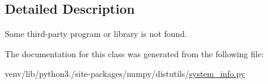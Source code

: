 \subsection{Detailed Description}
\begin{DoxyVerb}Some third-party program or library is not found.\end{DoxyVerb}
 

The documentation for this class was generated from the following file\+:\begin{DoxyCompactItemize}
\item 
venv/lib/python3./site-\/packages/numpy/distutils/\hyperlink{system__info_8py}{system\+\_\+info.\+py}\end{DoxyCompactItemize}
